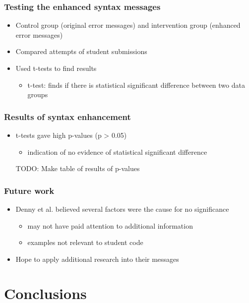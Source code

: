 \documentclass{beamer}
\begin{document}
\begin{frame}
	\frametitle{Testing the enhanced syntax messages}
		\begin{itemize}
			\item Control group (original error messages) and intervention group (enhanced error messages)
			\item Compared attempts of student submissions
			\item Used t-tests to find results
			\begin{itemize}
				\item t-test: finds if there is statistical significant difference between two data groups
			\end{itemize}
		\end{itemize}

\end{frame}

\begin{frame}
	\frametitle{Results of syntax enhancement}
		\begin{itemize}
			\item t-tests gave high p-values (p > 0.05)
				\begin{itemize}
				\item indication of no evidence of statistical significant difference
				\end{itemize}
				TODO: Make table of results of p-values
		\end{itemize}

\end{frame}

\begin{frame}
	\frametitle{Future work}
		\begin{itemize}
			\item Denny et al. believed several factors were the cause for no significance
			\begin{itemize}
				\item may not have paid attention to additional information
				\item examples not relevant to student code
			\end{itemize}
			\item Hope to apply additional research into their messages
		\end{itemize}

\end{frame}


\section[Conclusions]{Conclusions}
\end{document}
